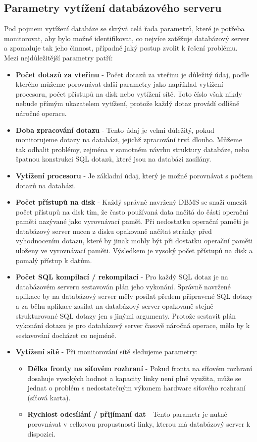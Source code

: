\documentclass[czech,bachelor,public,dept460,male,cpdeclaration,twoside]{diploma}
\begin{document}
\subsection{Parametry vytížení databázového serveru}
Pod pojmem vytížení databáze se skrývá celá řada parametrů, které je potřeba monitorovat, aby bylo možné identifikovat, co nejvíce zatěžuje databázový server a zpomaluje tak jeho činnost, případně jaký postup zvolit k řešení problému. Mezi nejdůležitější parametry patří:
\begin{itemize}
  \item \textbf{Počet dotazů za vteřinu} - Počet dotazů za vteřinu je důležitý údaj, podle kterého můžeme porovnávat další parametry jako například vytížení procesoru, počet přístupů na disk nebo vytížení sítě. Toto číslo však nikdy nebude přímým ukazatelem vytížení, protože každý dotaz provádí odlišně náročné operace.
  \item \textbf{Doba zpracování dotazu} - Tento údaj je velmi důležitý, pokud monitorujeme dotazy na databázi, jejichž zpracování trvá dlouho. Můžeme tak odhalit problémy, zejména v samotném návrhu struktury databáze, nebo špatnou konstrukci SQL dotazů, které jsou na databázi zasílány.
  \item \textbf{Vytížení procesoru} - Je základní údaj, který je možné porovnávat s počtem dotazů na databázi. 
  \item \textbf{Počet přístupů na disk} - Každý správně navržený DBMS se snaží omezit počet přístupů na disk tím, že často používaná data načítá do části operační paměti nazývané jako vyrovnávací paměť. Při nedostatku operační paměti je databázový server nucen z disku opakovaně načítat stránky před vyhodnocením dotazu, které by jinak mohly být při dostatku operační paměti uloženy ve vyrovnávací paměti. Výsledkem je vysoký počet přístupů na disk a pomalý přístup k datům.
  \item \textbf{Počet SQL kompilací / rekompilací} - Pro každý SQL dotaz je na databázovém serveru sestavován plán jeho vykonání. Správně navržené aplikace by na databázový server měly posílat předem připravené SQL dotazy a za běhu aplikace zasílat na databázový server opakovaně stejně strukturované SQL dotazy jen s jinými argumenty. Protože sestavit plán vykonání dotazu je pro databázový server časově náročná operace, mělo by k sestavování docházet co nejméně. 
  \item \textbf{Vytížení sítě} - Při monitorování sítě sledujeme parametry:
  \begin{itemize}
  	\item \textbf{Délka fronty na síťovém rozhraní} - Pokud fronta na síťovém rozhraní dosahuje vysokých hodnot a kapacity linky není plně využita, může se jednat o problém s nedostatečným výkonem hardware síťového rozhraní (síťová karta).
  	\item \textbf{Rychlost odesílání / přijímaní dat} - Tento parametr je nutné porovnávat v celkovou propustností linky, kterou má databázový server k dispozici. 
  \end{itemize}
\end{itemize}
\end{document}
